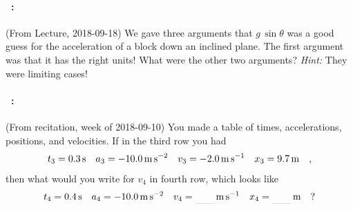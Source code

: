 \documentclass[12pt]{article}
\begin{document}
\vfill

\paragraph{\problemname~\theproblem:}%
(From Lecture, 2018-09-18)
We gave three arguments that $g\,\sin\theta$ was a good guess for the
acceleration of a block down an inclined plane. The first argument was that it
has the right units! What were the other two arguments? \emph{Hint:} They were limiting
cases!

\vfill

\paragraph{\problemname~\theproblem:}%
(From recitation, week of 2018-09-10)
You made a table of times, accelerations, positions, and velocities.
If in the third row you had
\begin{equation}
t_3 = 0.3\,\mathrm{s}
\quad
a_3 = -10.0\,\mathrm{m}\,\mathrm{s}^{-2}
\quad
v_3 = -2.0\,\mathrm{m}\,\mathrm{s}^{-1}
\quad
x_3 = 9.7\,\mathrm{m}
\quad ,
\end{equation}
then what would you write for $v_4$ in fourth row, which looks like
\begin{equation}
t_4 = 0.4\,\s
\quad
a_4 = -10.0\,\mpss
\quad
v_4 = \rule[-1ex]{20pt}{0.1pt}\,\mps
\quad
x_4 = \rule[-1ex]{20pt}{0.1pt}\,\m
\quad ?
\end{equation}

\vfill
~
\end{document}
